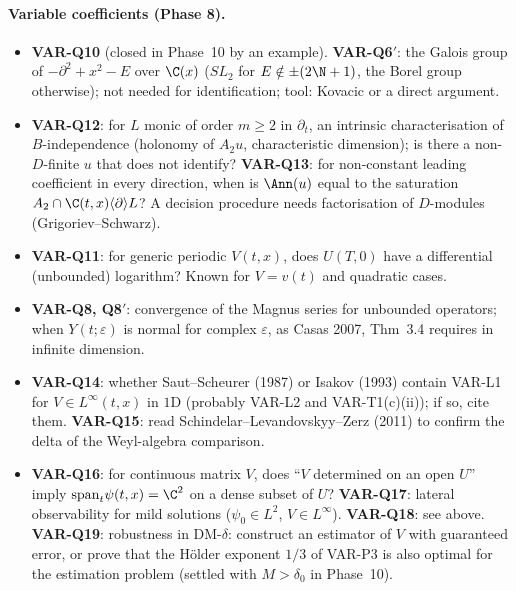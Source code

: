 \paragraph{Variable coefficients (Phase 8).}
\begin{itemize}
\item \textbf{VAR-Q10} (closed in Phase~10 by an example). \textbf{VAR-Q6$'$}: the Galois group of $-\partial^2+x^2-E$ over $\C(x)$ ($SL_2$ for $E\notin\pm(2\N+1)$, the Borel group otherwise); not needed for identification; tool: Kovacic or a direct argument.
\item \textbf{VAR-Q12}: for $L$ monic of order $m\ge2$ in $\partial_t$, an intrinsic characterisation of $B$-independence (holonomy of $A_2u$, characteristic dimension); is there a non-$D$-finite $u$ that does not identify? \textbf{VAR-Q13}: for non-constant leading coefficient in every direction, when is $\Ann(u)$ equal to the saturation $A_2\cap\C(t,x)\langle\partial\rangle L$? A decision procedure needs factorisation of $D$-modules (Grigoriev--Schwarz).
\item \textbf{VAR-Q11}: for generic periodic $V(t,x)$, does $U(T,0)$ have a differential (unbounded) logarithm? Known for $V=v(t)$ and quadratic cases.
\item \textbf{VAR-Q8, Q8$'$}: convergence of the Magnus series for unbounded operators; when $Y(t;\varepsilon)$ is normal for complex $\varepsilon$, as Casas 2007, Thm~3.4 requires in infinite dimension.
\item \textbf{VAR-Q14}: whether Saut--Scheurer (1987) or Isakov (1993) contain VAR-L1 for $V\in L^\infty(t,x)$ in $1$D (probably VAR-L2 and VAR-T1(c)(ii)); if so, cite them. \textbf{VAR-Q15}: read Schindelar--Levandovskyy--Zerz (2011) to confirm the delta of the Weyl-algebra comparison.
\item \textbf{VAR-Q16}: for continuous matrix $V$, does ``$V$ determined on an open $U$'' imply $\mathrm{span}_t\psi(t,x)=\C^2$ on a dense subset of $U$? \textbf{VAR-Q17}: lateral observability for mild solutions ($\psi_0\in L^2$, $V\in L^\infty$). \textbf{VAR-Q18}: see above. \textbf{VAR-Q19}: robustness in DM-$\delta$: construct an estimator of $V$ with guaranteed error, or prove that the H\"older exponent $1/3$ of VAR-P3 is also optimal for the estimation problem (settled with $M>\delta_0$ in Phase~10).
\end{itemize}

